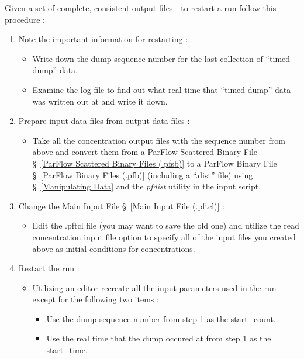 Given a set of complete, consistent output files - to restart a run follow
this procedure :

\begin{enumerate}
   \item Note the important information for restarting :
   \begin{itemize}
      \item Write down the dump sequence number for the last collection of
           ``timed dump'' data.
      \item Examine the log file to find out what real time that ``timed dump''
            data was written out at and write it down.
   \end{itemize}
   \item Prepare input data files from output data files :
   \begin{itemize}
      \item Take all the concentration output files with the sequence number
            from above and convert them from a ParFlow Scattered Binary File
            \S~\ref{ParFlow Scattered Binary Files (.pfsb)} to a ParFlow
            Binary File \S~\ref{ParFlow Binary Files (.pfb)} (including a
            ``.dist'' file) using \pftools{} \S~\ref{Manipulating Data} and the
            {\it pfdist} utility in the input script.
   \end{itemize}
   \item Change the Main Input File \S~\ref{Main Input File (.pftcl)} :
   \begin{itemize}
      \item Edit the .pftcl file (you may want to save the old one) and
            utilize the read concentration input file option to specify
            all of the input files you created above as initial conditions
            for concentrations.
   \end{itemize}
   \item Restart the run :
   \begin{itemize}
      \item Utilizing an editor recreate all the input parameters used
            in the run except for the following two items :
            \begin{itemize}
               \item Use the dump sequence number from step 1
                     as the start\_count.
               \item Use the real time that the dump occured at from step 1
                     as the start\_time.
            \end{itemize}
   \end{itemize}
\end{enumerate}

